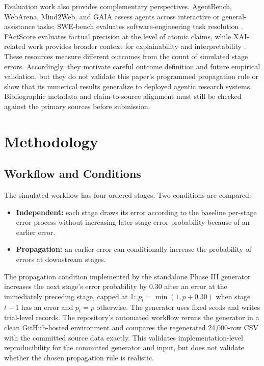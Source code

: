 \documentclass[conference]{IEEEtran}
\begin{document}
Evaluation work also provides complementary perspectives. AgentBench, WebArena, Mind2Web, and GAIA assess agents across interactive or general-assistance tasks; SWE-bench evaluates software-engineering task resolution \cite{liu2024agentbench,zhou2024webarena,deng2023mind2web,mialon2024gaia,jimenez2024swebench}. FActScore evaluates factual precision at the level of atomic claims, while XAI-related work provides broader context for explainability and interpretability \cite{min2023factscore,dwivedi2023xai}. These resources measure different outcomes from the count of simulated stage errors. Accordingly, they motivate careful outcome definition and future empirical validation, but they do not validate this paper's programmed propagation rule or show that its numerical results generalize to deployed agentic research systems. Bibliographic metadata and claim-to-source alignment must still be checked against the primary sources before submission.

\section{Methodology}
\subsection{Workflow and Conditions}
The simulated workflow has four ordered stages. Two conditions are compared:
\begin{itemize}
  \item \textbf{Independent:} each stage draws its error according to the baseline per-stage error process without increasing later-stage error probability because of an earlier error.
  \item \textbf{Propagation:} an earlier error can conditionally increase the probability of errors at downstream stages.
\end{itemize}
The propagation condition implemented by the standalone Phase III generator increases the next stage's error probability by 0.30 after an error at the immediately preceding stage, capped at 1: $p_{t}=\min(1,p+0.30)$ when stage $t-1$ has an error and $p_t=p$ otherwise. The generator uses fixed seeds and writes trial-level records. The repository's automated workflow reruns the generator in a clean GitHub-hosted environment and compares the regenerated 24,000-row CSV with the committed source data exactly. This validates implementation-level reproducibility for the committed generator and input, but does not validate whether the chosen propagation rule is realistic.
\end{document}
